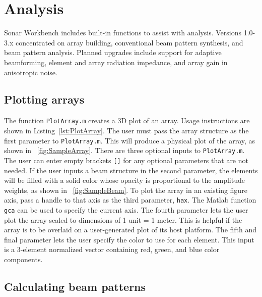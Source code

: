 \chapter{Analysis}\label{ch:analysis}

Sonar Workbench includes built-in functions to assist with analysis.  Versions 1.0-3.x concentrated on array building, conventional beam pattern synthesis, and beam pattern analysis.  Planned upgrades include support for adaptive beamforming, element and array radiation impedance, and array gain in anisotropic noise.

\section{Plotting arrays}

The function \texttt{PlotArray.m} creates a 3D plot of an array. Usage instructions are shown in Listing~\ref{lst:PlotArray}. The user must pass the array structure as the first parameter to \texttt{PlotArray.m}. This will produce a physical plot of the array, as shown in \figname~\ref{fig:SampleArray}. There are three optional inputs to \texttt{PlotArray.m}. The user can enter empty brackets \texttt{[]} for any optional parameters that are not needed. If the user inputs a beam structure in the second parameter, the elements will be filled with a solid color whose opacity is proportional to the amplitude weights, as shown in \figname~\ref{fig:SampleBeam}. To plot the array in an existing figure axis, pass a handle to that axis as the third parameter, \texttt{hax}. The Matlab function \texttt{gca} can be used to specify the current axis. The fourth parameter lets the user plot the array scaled to dimensions of 1 unit = 1 meter. This is helpful if the array is to be overlaid on a user-generated plot of its host platform. The fifth and final parameter lets the user specify the color to use for each element. This input is a 3-element normalized vector containing red, green, and blue color components.

\newpage

 
\section{Calculating beam patterns}

